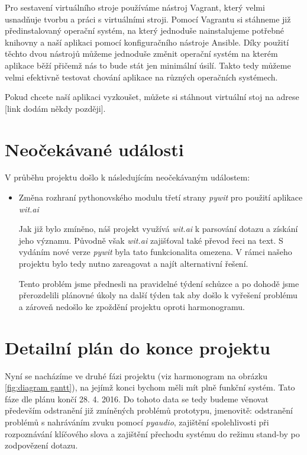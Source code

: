 \documentclass[12pt,a4paper]{article}
\begin{document}
Pro sestavení virtuálního stroje používáme nástroj Vagrant, který velmi usnadňuje tvorbu a práci s virtuálními stroji. Pomocí Vagrantu si stáhneme již předinstalovaný operační systém, na který jednoduše nainstalujeme potřebné knihovny a naší aplikaci pomocí konfiguračního nástroje Ansible. Díky použití těchto dvou nástrojů můžeme jednoduše změnit operační systém na kterém aplikace běží přičemž nás to bude stát jen minimální úsilí. Takto tedy můžeme velmi efektivně testovat chování aplikace na různých operačních systémech.

Pokud chcete naší aplikaci vyzkoušet, můžete si stáhnout virtuální stoj na adrese [link dodám někdy později].

\section*{Neočekávané události}
V průběhu projektu došlo k následujícím neočekávaným událostem:
\begin{itemize}
	\item Změna rozhraní pythonovského modulu třetí strany \textit{pywit} pro použití aplikace \textit{wit.ai}
	
	Jak již bylo zmíněno, náš projekt využívá \textit{wit.ai} k parsování dotazu a získání jeho významu. Původně však \textit{wit.ai} zajišťoval také převod řeci na text. S vydáním nové verze \textit{pywit} byla tato funkcionalita omezena. V rámci našeho projektu bylo tedy nutno zareagovat a najít alternativní řešení. 
	
	Tento problém jsme přednesli na pravidelné týdení schůzce a po dohodě jsme přerozdelili plánovné úkoly na další týden tak aby došlo k vyřešení problému a zároveň nedošlo ke zpoždění projektu oproti harmonogramu.
	

\end{itemize}

\section*{Detailní plán do konce projektu}
Nyní se nacházíme ve druhé fázi projektu (viz harmonogram na obrázku \ref{fig:diagram gantt}), na jejímž konci bychom měli mít plně funkční systém. Tato fáze dle plánu končí 28. 4. 2016. Do tohoto data se tedy budeme věnovat především odstranění již zmíněných problémů prototypu, jmenovitě: odstranění problémů s nahráváním zvuku pomocí \textit{pyaudio}, zajištění spolehlivosti při rozpoznávání klíčového slova a zajištění přechodu systému do režimu stand-by po zodpovězení dotazu.
\end{document}

